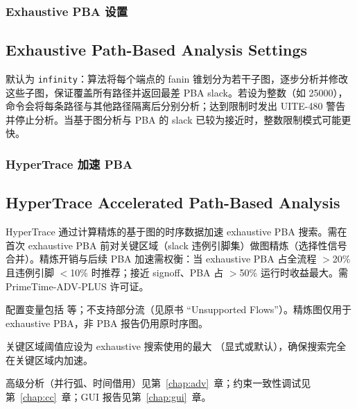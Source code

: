 \subsubsection{Exhaustive PBA 设置}
\subsection*{Exhaustive Path-Based Analysis Settings}

 默认为 \texttt{infinity}：算法将每个端点的 fanin 锥划分为若干子图，逐步分析并修改这些子图，保证覆盖所有路径并返回最差 PBA slack。若设为整数（如 25000），命令会将每条路径与其他路径隔离后分别分析；达到限制时发出 UITE-480 警告并停止分析。当基于图分析与 PBA 的 slack 已较为接近时，整数限制模式可能更快。

\subsubsection{HyperTrace 加速 PBA}
\subsection*{HyperTrace Accelerated Path-Based Analysis}

HyperTrace 通过计算精炼的基于图的时序数据加速 exhaustive PBA 搜索。需在首次 exhaustive PBA 前对关键区域（slack 违例引脚集）做图精炼（选择性信号合并）。精炼开销与后续 PBA 加速需权衡：当 exhaustive PBA 占全流程 $>$20\% 且违例引脚 $<$10\% 时推荐；接近 signoff、PBA 占 $>$50\% 运行时收益最大。需 PrimeTime-ADV-PLUS 许可证。

配置变量包括  等；不支持部分流（见原书 “Unsupported Flows”）。精炼图仅用于 exhaustive PBA，非 PBA 报告仍用原时序图。

关键区域阈值应设为 exhaustive 搜索使用的最大 （显式或默认），确保搜索完全在关键区域内加速。

\begin{seeAlsoBox}
高级分析（并行弧、时间借用）见第~\ref{chap:adv}~章；约束一致性调试见第~\ref{chap:cc}~章；GUI 报告见第~\ref{chap:gui}~章。
\end{seeAlsoBox}

